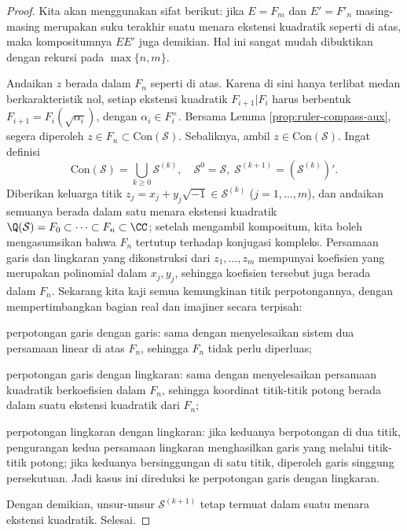 \begin{proof}
	Kita akan menggunakan sifat berikut: jika $E = F_m$ dan $E' = F'_n$ masing-masing merupakan suku terakhir suatu menara ekstensi kuadratik seperti di atas, maka kompositumnya $EE'$ juga demikian. Hal ini sangat mudah dibuktikan dengan rekursi pada $\max\{n,m\}$.

	Andaikan $z$ berada dalam $F_n$ seperti di atas. Karena di sini hanya terlibat medan berkarakteristik nol, setiap ekstensi kuadratik $F_{i+1}|F_i$ harus berbentuk $F_{i+1} = F_i(\sqrt{\alpha_i})$, dengan $\alpha_i \in F_i^\times$. Bersama Lemma \ref{prop:ruler-compass-aux}, segera diperoleh $z \in F_n \subset \text{Con}(\mathcal{S})$. Sebaliknya, ambil $z \in \text{Con}(\mathcal{S})$. Ingat definisi
	\[ \text{Con}(\mathcal{S}) = \bigcup_{k \geq 0} \mathcal{S}^{(k)}, \quad \mathcal{S}^0 = \mathcal{S}, \; \mathcal{S}^{(k+1)} = (\mathcal{S}^{(k)})'. \]
	Diberikan keluarga titik $z_j = x_j + y_j \sqrt{-1} \in \mathcal{S}^{(k)}$ ($j=1,\ldots, m$), dan andaikan semuanya berada dalam satu menara ekstensi kuadratik $\Q(\mathcal{S}) = F_0 \subset \cdots \subset F_n \subset \CC$; setelah mengambil kompositum, kita boleh mengasumsikan bahwa $F_n$ tertutup terhadap konjugasi kompleks. Persamaan garis dan lingkaran yang dikonstruksi dari $z_1, \ldots, z_m$ mempunyai koefisien yang merupakan polinomial dalam $x_j, y_j$, sehingga koefisien tersebut juga berada dalam $F_n$. Sekarang kita kaji semua kemungkinan titik perpotongannya, dengan mempertimbangkan bagian real dan imajiner secara terpisah:
	\begin{compactenum}[(a)]
		\item perpotongan garis dengan garis: sama dengan menyelesaikan sistem dua persamaan linear di atas $F_n$, sehingga $F_n$ tidak perlu diperluas;
		\item perpotongan garis dengan lingkaran: sama dengan menyelesaikan persamaan kuadratik berkoefisien dalam $F_n$, sehingga koordinat titik-titik potong berada dalam suatu ekstensi kuadratik dari $F_n$;
		\item perpotongan lingkaran dengan lingkaran: jika keduanya berpotongan di dua titik, pengurangan kedua persamaan lingkaran menghasilkan garis yang melalui titik-titik potong; jika keduanya bersinggungan di satu titik, diperoleh garis singgung persekutuan. Jadi kasus ini direduksi ke perpotongan garis dengan lingkaran.
	\end{compactenum}
	Dengan demikian, unsur-unsur $\mathcal{S}^{(k+1)}$ tetap termuat dalam suatu menara ekstensi kuadratik. Selesai.
\end{proof}

